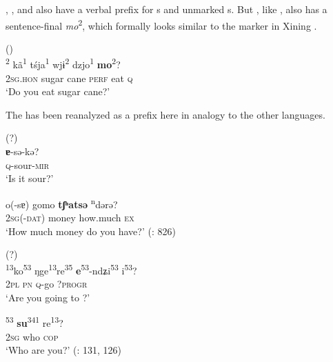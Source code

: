  ,  , and    also have a verbal prefix for s and unmarked s. But , like , also has a sen\-tence-final  \textit{mo}\textsuperscript{2}, which formally looks similar to the marker in Xining  . 

\ea%
    \label{ex:trans:38}
     ()\\
    \textsuperscript{2} {kã}\textsuperscript{1} {tśja}\textsuperscript{1} {wjɨ}\textsuperscript{2} {dzjo}\textsuperscript{1} \textbf{{mo}}\textsuperscript{2}?\\
    2\textsc{sg}.\textsc{hon}  sugar  cane  \textsc{perf}  eat  \textsc{q}\\
    \glt ‘Do you eat sugar cane?’ \citep[614]{Gong2003}
    \z

The   has been reanalyzed as a prefix here in analogy to the other languages.

\ea%
    \label{ex:trans:39}
     (?)\\
    \ea
    \gll \textbf{{ɐ}}{-sə-kə?}\\
    \textsc{q}-sour-\textsc{mir}\\
    \glt ‘Is it sour?’
    
    \ex
    o(-sɐ)  gomo \textbf{{tʃ}}\textbf{{ʰ}}\textbf{{atsə}} {\textsuperscript{n}}{də}{rə?}\\
    2\textsc{sg}(-\textsc{dat})  money    how.much  \textsc{ex}\\
    \glt ‘How much money do you have?’ (\citealt{Sun2003a}: 826)
    \z
    \z

\newpage     
\ea%
    \label{ex:trans:40}
     (?)\\
    \ea
    \textsuperscript{13}{ko}\textsuperscript{53} {ŋge}\textsuperscript{13}{re}\textsuperscript{35} \textbf{{e}}\textsuperscript{53}{-ndʑi}\textsuperscript{53} {i}\textsuperscript{53}?\\
    2\textsc{pl}    \textsc{pn}    \textsc{q}-go    ?\textsc{progr}\\
    \glt ‘Are you going to ?’
    
    \ex
    \textsuperscript{53} \textbf{{su}}\textsuperscript{341} {re}\textsuperscript{13}?\\
    2\textsc{sg}  who  \textsc{cop}\\
    \glt ‘Who are you?’ (\citealt{Sun1996}: 131, 126)
    \z
    \z

